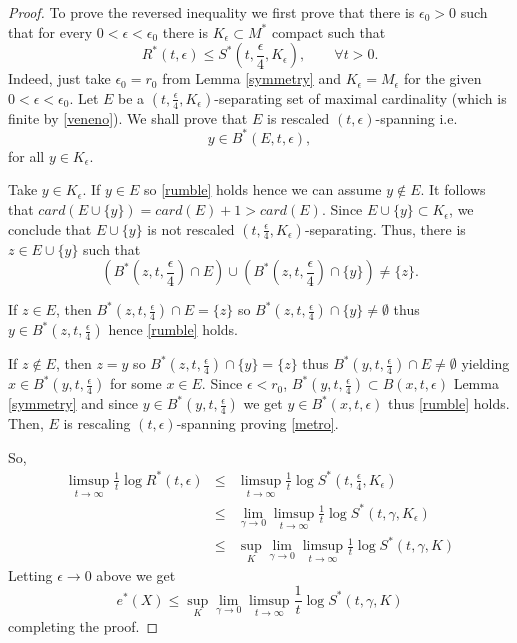 \documentclass[10pt,a4paper]{amsart}
\begin{document}
\begin{proof}
To prove the reversed inequality we first prove that there is $\epsilon_0>0$ such that
for every $0<\epsilon<\epsilon_0$ there is $K_\epsilon\subset M^*$ compact such that
\begin{equation}
\label{metro}
 R^*(t,\epsilon)\leq S^*(t,\frac{\epsilon}4,K_\epsilon),\quad\quad\forall t>0.
\end{equation}
Indeed, just take $\epsilon_0=r_0$ from Lemma \ref{symmetry} and $K_\epsilon=M_\epsilon$ for the given $0<\epsilon<\epsilon_0$.
Let $E$ be a $(t,\frac{\epsilon}4,K_\epsilon)$-separating set of maximal cardinality (which is finite by \eqref{veneno}). We shall prove that $E$ is rescaled $(t,\epsilon)$-spanning i.e.
\begin{equation}
\label{rumble}
y\in B^*(E,t,\epsilon),
\end{equation}
for all $y\in K_\epsilon$.

Take $y\in K_\epsilon$.
If $y\in E$ so \eqref{rumble} holds hence we can assume
$y\notin E$. It follows that $card(E\cup \{y\})=card(E)+1>card(E)$.
Since $E\cup \{y\}\subset K_\epsilon$,
we conclude that $E\cup \{y\}$ is not rescaled $(t,\frac{\epsilon}4,K_\epsilon)$-separating. Thus, there is $z\in E\cup \{y\}$ such that
$$
(B^*(z,t,\frac{\epsilon}4)\cap E)\cup (B^*(z,t,\frac{\epsilon}4)\cap \{y\})\neq \{z\}.
$$

If $z\in E$, then $B^*(z,t,\frac{\epsilon}4)\cap E=\{z\}$ so $B^*(z,t,\frac{\epsilon}4)\cap \{y\}\neq\emptyset$ thus
$y\in B^*(z,t,\frac{\epsilon}4)$ hence \eqref{rumble} holds.

If $z\notin E$, then $z=y$ so $B^*(z,t,\frac{\epsilon}4)\cap \{y\}=\{z\}$ thus
$B^*(y,t,\frac{\epsilon}4)\cap E\neq\emptyset$ yielding
$x\in B^*(y,t,\frac{\epsilon}4)$ for some $x\in E$.
Since $\epsilon<r_0$, $B^*(y,t,\frac{\epsilon}4)\subset B(x,t,\epsilon)$
Lemma \ref{symmetry} and since $y\in B^*(y,t,\frac{\epsilon}4)$ we get
$y\in B^*(x,t,\epsilon)$  thus \eqref{rumble} holds.
Then, $E$ is rescaling $(t,\epsilon)$-spanning proving \eqref{metro}.

So,
\begin{eqnarray*}
\limsup_{t\to\infty}\frac{1}t\log R^*(t,\epsilon)&\leq& \limsup_{t\to\infty}\frac{1}t\log S^*(t,\frac{\epsilon}4,K_\epsilon)\\
&\leq& \lim_{\gamma\to0}\limsup_{t\to\infty}\frac{1}t\log S^*(t,\gamma,K_\epsilon)\\
&\leq & \sup_K\lim_{\gamma\to0}\limsup_{t\to\infty}\frac{1}t\log S^*(t,\gamma,K)
\end{eqnarray*}
Letting $\epsilon\to0$ above we get
$$
e^*(X)\leq \sup_K\lim_{\gamma\to0}\limsup_{t\to\infty}\frac{1}t\log S^*(t,\gamma,K)
$$
completing the proof.
\end{proof}
\end{document}
